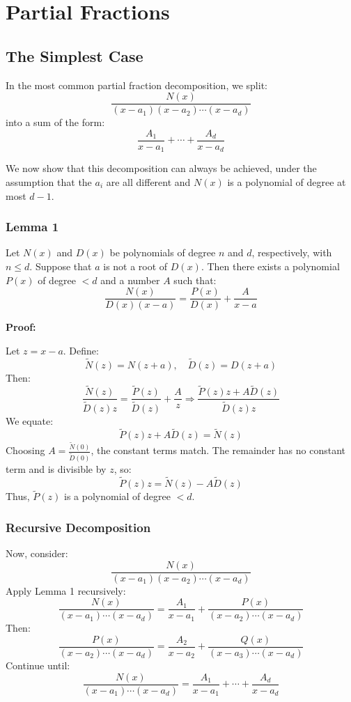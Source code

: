 \section{Partial Fractions}

\subsection{The Simplest Case}

In the most common partial fraction decomposition, we split:
\[
\frac{N(x)}{(x - a_1)(x - a_2)\cdots(x - a_d)}
\]
into a sum of the form:
\[
\frac{A_1}{x - a_1} + \cdots + \frac{A_d}{x - a_d}
\]

We now show that this decomposition can always be achieved, under the assumption that the \(a_i\) are all different and \(N(x)\) is a polynomial of degree at most \(d - 1\).

\subsubsection{Lemma 1}

Let \(N(x)\) and \(D(x)\) be polynomials of degree \(n\) and \(d\), respectively, with \(n \leq d\). Suppose that \(a\) is not a root of \(D(x)\). Then there exists a polynomial \(P(x)\) of degree \(< d\) and a number \(A\) such that:
\[
\frac{N(x)}{D(x)(x - a)} = \frac{P(x)}{D(x)} + \frac{A}{x - a}
\]

\textbf{Proof:} 

Let \(z = x - a\). Define:
\[
\tilde{N}(z) = N(z + a), \quad \tilde{D}(z) = D(z + a)
\]
Then:
\[
\frac{\tilde{N}(z)}{\tilde{D}(z)z} = \frac{\tilde{P}(z)}{\tilde{D}(z)} + \frac{A}{z}
\Rightarrow \frac{\tilde{P}(z)z + A\tilde{D}(z)}{\tilde{D}(z)z}
\]
We equate:
\[
\tilde{P}(z)z + A\tilde{D}(z) = \tilde{N}(z)
\]
Choosing \(A = \frac{\tilde{N}(0)}{\tilde{D}(0)}\), the constant terms match. The remainder has no constant term and is divisible by \(z\), so:
\[
\tilde{P}(z)z = \tilde{N}(z) - A\tilde{D}(z)
\]
Thus, \(\tilde{P}(z)\) is a polynomial of degree \(< d\).

\subsubsection{Recursive Decomposition}

Now, consider:
\[
\frac{N(x)}{(x - a_1)(x - a_2)\cdots(x - a_d)}
\]
Apply Lemma 1 recursively:
\[
\frac{N(x)}{(x - a_1)\cdots(x - a_d)} = \frac{A_1}{x - a_1} + \frac{P(x)}{(x - a_2)\cdots(x - a_d)}
\]
Then:
\[
\frac{P(x)}{(x - a_2)\cdots(x - a_d)} = \frac{A_2}{x - a_2} + \frac{Q(x)}{(x - a_3)\cdots(x - a_d)}
\]
Continue until:
\[
\frac{N(x)}{(x - a_1)\cdots(x - a_d)} = \frac{A_1}{x - a_1} + \cdots + \frac{A_d}{x - a_d}
\]

